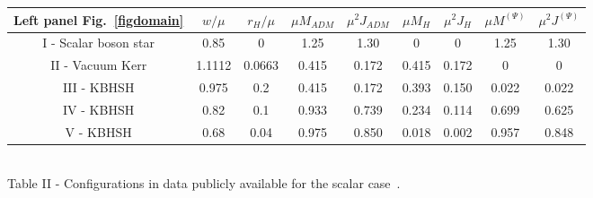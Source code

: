 \bigskip

\begin{center}
\begin{tabular}{|c||c|c|c|c|c|c|c|c|}
\hline
Left panel Fig.~\ref{figdomain} & $w/\mu$  & $r_H/\mu$ & $\mu M_{ADM}$ & $\mu^2J_{ADM}$ & $\mu M_{H}$ & $\mu^2J_{H}$ & $\mu M^{(\Psi)}$ & $\mu^2J^{(\Psi)}$   \\ \hline\hline
I - Scalar boson star  & 0.85 & 0 & 1.25 & 1.30 & 0 & 0 & 1.25 & 1.30 
\\ \hline
II - Vacuum Kerr  & 1.1112 & 0.0663 & 0.415 & 0.172 & 0.415 & 0.172 & 0 & 0
\\ \hline
III - KBHSH & 0.975 & 0.2 & 0.415 & 0.172 & 0.393 & 0.150 & 0.022 & 0.022
\\ \hline
IV - KBHSH & 0.82& 0.1 & 0.933 & 0.739 & 0.234 & 0.114 & 0.699 & 0.625
\\ \hline
V - KBHSH & 0.68& 0.04 & 0.975 & 0.850 & 0.018 & 0.002 & 0.957 & 0.848
\\ \hline 
\end{tabular}\\ \bigskip
Table II - Configurations in data publicly available for the scalar case~\cite{datakbhsh}.
\end{center}


